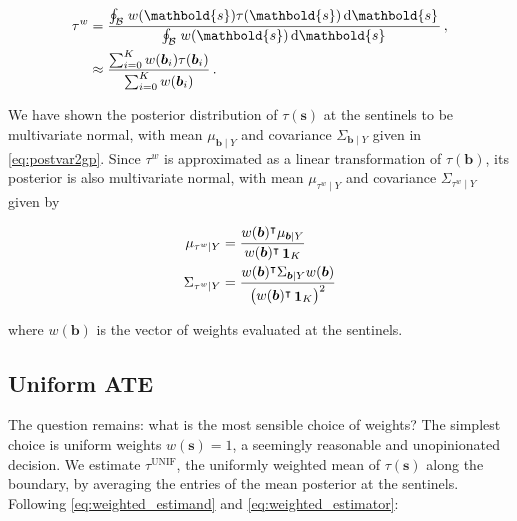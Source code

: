 \documentclass[letter]{article}
\DeclareMathOperator{\ones}{\mathbf{1}}
\newcommand{\trans}{^{\intercal}}
\newcommand{\svec}{\mathbold{s}}
\newcommand{\boundary}{\mathcal{B}}
\newcommand{\sentinels}{\bm{b}}
\newcommand{\tauw}{\tau^{w}}
\newcommand{\unifavg}{\tau^{\mathrm{UNIF}}}
\newcommand{\eqlabel}[1]{\label{#1}}
\begin{document}
\begin{equation}\begin{split}
    \tauw &= \frac{\oint_\boundary \left. w(\svec) \tau(\svec) \dif \svec \right.}
                  {\oint_\boundary \left. w(\svec) \dif \svec \right.}\,,\\
          &\approx \frac{\sum_{i=0}^K w(\sentinels_i) \tau(\sentinels_i)}
                       {\sum_{i=0}^K w(\sentinels_i) } \,.
\end{split}
\eqlabel{eq:weighted_estimand}
\end{equation}

We have shown the posterior distribution of \(\tau(\svec)\) at the sentinels to be multivariate normal, with mean \(\mu_{\sentinels \mid Y}\) and covariance \(\Sigma_{\sentinels \mid Y}\) given in \eqref{eq:postvar2gp}.
Since \(\tauw\) is approximated as a linear transformation of \(\tau(\sentinels)\), its posterior is also multivariate normal, with mean \(\mu_{\tauw \mid Y}\) and covariance \(\Sigma_{\tauw \mid Y}\) given by

\begin{equation}\begin{split}
    \mu_{\tauw \mid Y} &= \frac{w(\sentinels)\trans \mu_{\sentinels \mid Y}}
                               {w(\sentinels)\trans  \ones_K} \\
    \Sigma_{\tauw \mid Y} &= \frac{w(\sentinels)\trans \Sigma_{\sentinels \mid Y} w(\sentinels)}
                                  { \del{w(\sentinels)\trans  \ones_K }^2 }\\
\end{split}
\eqlabel{eq:weighted_estimator}
\end{equation}

where \(w(\sentinels)\) is the vector of weights evaluated at the sentinels.
    


    	\subsection{Uniform ATE}\label{uniform-ate}

The question remains: what is the most sensible choice of weights?
The simplest choice is uniform weights \(w(\svec)=1\), a seemingly reasonable and unopinionated decision.
We estimate \(\unifavg\), the uniformly weighted mean of \(\tau(\svec)\) along the boundary, by averaging the entries of the mean posterior at the sentinels.
Following \eqref{eq:weighted_estimand} and \eqref{eq:weighted_estimator}:
\end{document}

